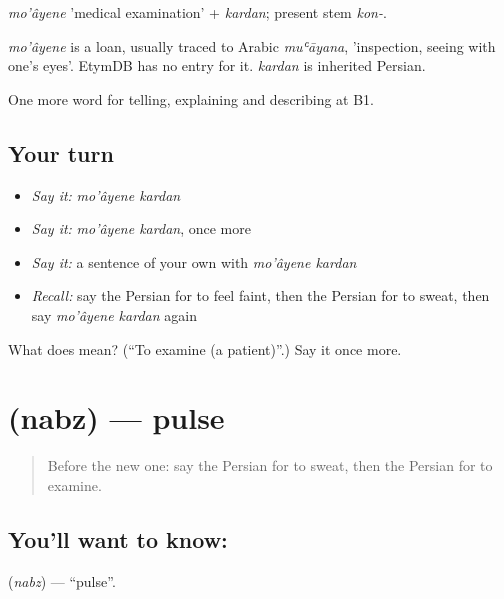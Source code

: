 \emph{mo'âyene} 'medical examination' + \emph{kardan}; present stem \emph{kon-}.

\begin{cousinweb}
\emph{mo'âyene} is a loan, usually traced to Arabic \emph{muʿāyana}, 'inspection, seeing with one's eyes'. EtymDB has no entry for it. \emph{kardan} is inherited Persian.
\end{cousinweb}

\begin{grammarlens}[title={What you've built}]
One more word for telling, explaining and describing at B1.
\end{grammarlens}

\subsection*{Your turn}
\begin{itemize}
\raggedright
  \item \emph{Say it:} \emph{mo'âyene kardan}
  \item \emph{Say it:} \emph{mo'âyene kardan}, once more
  \item \emph{Say it:} a sentence of your own with \emph{mo'âyene kardan}
  \item \emph{Recall:} say the Persian for to feel faint, then the Persian for to sweat, then say \emph{mo'âyene kardan} again
\end{itemize}

\begin{tcolorbox}[breakable,colback=teal!4,colframe=teal!35!black,title={Before you move on}]
What does   mean? (\textquotedblleft{}To examine (a patient)\textquotedblright{}.) Say it once more.
\end{tcolorbox}
\section[\texorpdfstring{\fa{نبض} (nabz)}{نبض (nabz)}]{ (nabz) — pulse}

\label{lesson:FA-C493-nabz}



\begin{quote}
Before the new one: say the Persian for to sweat, then the Persian for to examine.
\end{quote}

\subsection*{You'll want to know: }
\textbf{} (\emph{nabz}) — \textquotedblleft{}pulse\textquotedblright{}.

